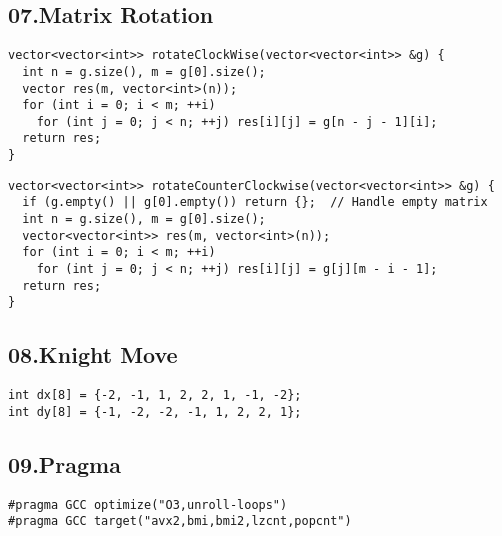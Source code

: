 \documentclass[twoside]{article}
\begin{document}
\begin{multicols*}{2}
{
\subsection*{07.Matrix Rotation}
}
\begin{verbatim}
vector<vector<int>> rotateClockWise(vector<vector<int>> &g) {
  int n = g.size(), m = g[0].size();
  vector res(m, vector<int>(n));
  for (int i = 0; i < m; ++i)
    for (int j = 0; j < n; ++j) res[i][j] = g[n - j - 1][i];
  return res;
}
\end{verbatim}
\vspace{-12pt}
\begin{verbatim}
vector<vector<int>> rotateCounterClockwise(vector<vector<int>> &g) {
  if (g.empty() || g[0].empty()) return {};  // Handle empty matrix
  int n = g.size(), m = g[0].size();
  vector<vector<int>> res(m, vector<int>(n));
  for (int i = 0; i < m; ++i)
    for (int j = 0; j < n; ++j) res[i][j] = g[j][m - i - 1];
  return res;
}
\end{verbatim}

{
\subsection*{08.Knight Move}
}
\begin{verbatim}
int dx[8] = {-2, -1, 1, 2, 2, 1, -1, -2};
int dy[8] = {-1, -2, -2, -1, 1, 2, 2, 1};
\end{verbatim}

{
\subsection*{09.Pragma}
}
\begin{verbatim}
#pragma GCC optimize("O3,unroll-loops")
#pragma GCC target("avx2,bmi,bmi2,lzcnt,popcnt")


\end{verbatim}
\end{multicols*}
\end{document}
